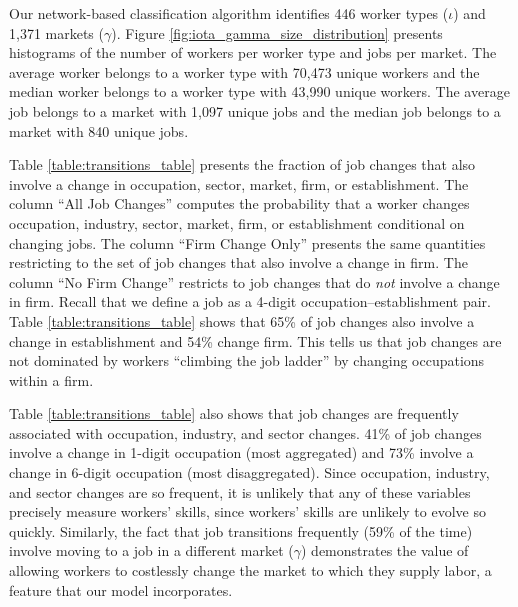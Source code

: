 \documentclass[12pt]{article}
\def\g{\gamma}
\def\i{\iota}
\theoremstyle{definition}
\theoremstyle{plain}
\begin{document}
Our network-based classification algorithm identifies 446 worker types ($\i$) and 1,371 markets ($\g$). Figure \ref{fig:iota_gamma_size_distribution} presents histograms of the number of workers per worker type and jobs per market. The average worker belongs to a worker type with 70,473 unique workers and the median worker belongs to a worker type with 43,990 unique workers. The average job belongs to a market with 1,097 unique jobs and the median job belongs to a market with 840 unique jobs. 

Table \ref{table:transitions_table} presents the fraction of job changes that also involve a change in occupation, sector, market, firm, or establishment. The column ``All Job Changes'' computes the probability that a worker changes occupation, industry, sector, market, firm, or establishment conditional on changing jobs. The column ``Firm Change Only'' presents the same quantities restricting to the set of job changes that also involve a change in firm. The column ``No Firm Change'' restricts to job changes that do \emph{not} involve a change in firm. Recall that we define a job as a 4-digit occupation--establishment pair. Table \ref{table:transitions_table} shows that 65\% of job changes also involve a change in establishment and 54\% change firm. This tells us that job changes are not dominated by workers ``climbing the job ladder'' by changing occupations within a firm. 

Table \ref{table:transitions_table} also shows that job changes are frequently associated with occupation, industry, and sector changes. 41\% of job changes involve a change in 1-digit occupation (most aggregated) and 73\% involve a change in 6-digit occupation (most disaggregated). Since occupation, industry, and sector changes are so frequent, it is unlikely that any of these variables precisely measure workers' skills, since workers' skills are unlikely to evolve so quickly. Similarly, the fact that job transitions frequently (59\% of the time) involve moving to a job in a different market ($\g$) demonstrates the value of allowing workers to costlessly change the market to which they supply labor, a feature that our model incorporates. 
\end{document}
